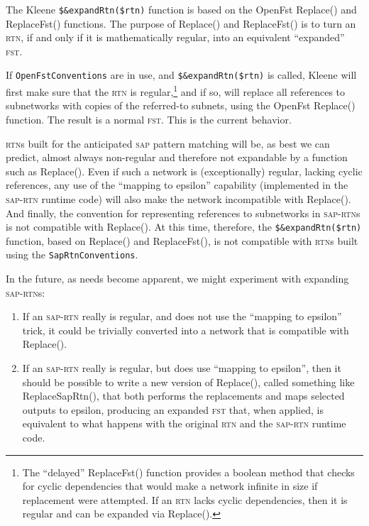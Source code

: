 \documentclass[letterpaper,12pt]{article}
\providecommand{\acro}{}\renewcommand{\acro}{\textsc}
\begin{document}
The Kleene \verb!$&expandRtn($rtn)! function is based on the OpenFst Replace() and
ReplaceFst() functions.  The purpose of Replace() and ReplaceFst() is to turn an
\acro{rtn}, if and only if it is mathematically regular, into an equivalent ``expanded''
\acro{fst}.

If \texttt{OpenFstConventions} are in use, and \verb!$&expandRtn($rtn)! is called, Kleene will first make sure that the
\acro{rtn} is regular,\footnote{The ``delayed'' ReplaceFst() function provides a
boolean method that checks for cyclic dependencies that would make a network infinite
in size if replacement were attempted.  If an \acro{rtn} lacks cyclic dependencies,
then it is regular and can be expanded via Replace().} and if so, will replace all references to
subnetworks with copies of the referred-to subnets, using the OpenFst Replace()
function.  The result is a normal \acro{fst}.  This is the current behavior.

\acro{rtn}s built for the anticipated \acro{sap} pattern matching will be, as best
we can predict,
almost always non-regular and therefore not expandable by a function such as
Replace().  Even if such a network is (exceptionally) regular, lacking cyclic references, any use of
the ``mapping to epsilon'' capability (implemented in the \acro{sap-rtn} runtime
code) will also make the network incompatible with Replace().  And finally, the
convention for representing references to subnetworks in \acro{sap-rtn}s is not
compatible with Replace().  At this time,
therefore, the \verb!$&expandRtn($rtn)! function, based on Replace() and
ReplaceFst(), is not compatible with \acro{rtn}s
built using the \texttt{SapRtnConventions}.

In the future, as needs become apparent, we might experiment with expanding
\acro{sap-rtn}s:

\begin{enumerate}
\item
If an \acro{sap-rtn} really is regular, and does not use the ``mapping to epsilon''
trick, it could be trivially converted into a network that is compatible with
Replace().

\item
If an \acro{sap-rtn} really is regular, but does use ``mapping to epsilon'', then it
should be possible to write a new version of Replace(), called something like
ReplaceSapRtn(), that both performs the replacements and maps selected outputs to
epsilon, producing an expanded \acro{fst} that, when applied, is equivalent to
what happens with the original \acro{rtn} and the \acro{sap-rtn} runtime code.

\end{enumerate}
\end{document}
